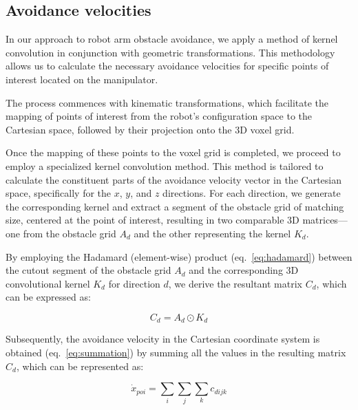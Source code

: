 \documentclass[a4paper]{article}
\begin{document}
\subsection{Avoidance velocities}

In our approach to robot arm obstacle avoidance, we apply a method of kernel convolution in conjunction with geometric transformations. This methodology allows us to calculate the necessary avoidance velocities for specific points of interest located on the manipulator.

The process commences with kinematic transformations, which facilitate the mapping of points of interest from the robot's configuration space to the Cartesian space, followed by their projection onto the 3D voxel grid.


Once the mapping of these points to the voxel grid is completed, we proceed to employ a specialized kernel convolution method. This method is tailored to calculate the constituent parts of the avoidance velocity vector in the Cartesian space, specifically for the \(x\), \(y\), and \(z\) directions. For each direction, we generate the corresponding kernel and extract a segment of the obstacle grid of matching size, centered at the point of interest, resulting in two comparable 3D matrices—one from the obstacle grid $A_d$ and the other representing the kernel $K_d$.

By employing the Hadamard (element-wise) product (eq.~\ref{eq:hadamard}) between the cutout segment of the obstacle grid \(A_d\) and the corresponding 3D convolutional kernel \(K_d\) for direction \(d\), we derive the resultant matrix \(C_d\), which can be expressed as:

\begin{equation}
	C_d = A_d \odot K_d
	\label{eq:hadamard}
\end{equation}

Subsequently, the avoidance velocity in the Cartesian coordinate system is obtained (eq.~\ref{eq:summation}) by summing all the values in the resulting matrix $C_d$, which can be represented as:

\begin{equation}
	\dot{x}_{poi} = \sum_{i}\sum_{j}\sum_{k} c_{dijk} 
	\label{eq:summation}
\end{equation}
\end{document}
